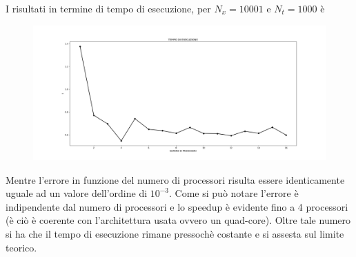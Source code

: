 \documentclass[italian]{article}
\begin{document}
I risultati in termine di tempo di esecuzione, per $N_x=10001$ e $N_t=1000$ è
\begin{figure}[H]
\centering
  \includegraphics[width=1\linewidth]{ompt.png}
\end{figure}
Mentre l'errore  in funzione del numero di processori risulta essere identicamente uguale ad un valore dell'ordine di $10^{-3}$.
Come si può notare l'errore è indipendente dal numero di processori e lo speedup è evidente fino a 4 processori (è ciò è coerente con l'architettura usata ovvero un quad-core). Oltre tale numero si ha che il tempo di esecuzione rimane pressochè costante e si assesta sul limite teorico.
\end{document}
